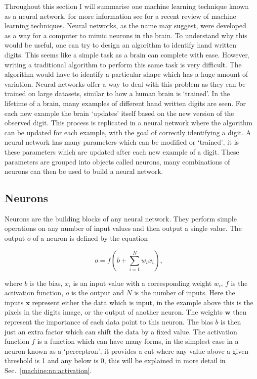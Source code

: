 Throughout this section I will summarise one machine learning technique known as a neural network, for more information see \citep{emmert-streib2020IntroductoryReview} for a recent review of machine learning techniques. 
Neural networks, as the name may suggest, were developed as a way for a computer to mimic neurons in the brain.
To understand why this would be useful, one can try to design an algorithm to identify hand written digits.
This seems like a simple task as a brain can complete with ease. 
However, writing a traditional algorithm to perform this same task is very difficult. 
The algorithm would have to identify a particular shape which has a huge amount of variation.
Neural networks offer a way to deal with this problem as they can be trained on large datasets, similar to how a human brain is `trained'. 
In the lifetime of a brain, many examples of different hand written digits are seen. 
For each new example the brain `updates' itself based on the new version of the observed digit. 
This process is replicated in a neural network where the algorithm can be updated for each example, with the goal of correctly identifying a digit.
A neural network has many parameters which can be modified or `trained', it is these parameters which are updated after each new example of a digit. 
These parameters are grouped into objects called neurons, many combinations of neurons can then be used to build a neural network.

\subsection{\label{machine:nn:neuron}Neurons}

Neurons are the building blocks of any neural network.
They perform simple operations on any number of input values and then output a single value.
The output $o$ of a neuron is defined by the equation

\begin{equation}
    o = f\left(b + \sum_{i=1}^{N} w_i x_i  \right),
    \label{machine:nn:neuron:equation}
\end{equation}

where $b$ is the bias, $x_i$ is an input value with a corresponding weight $w_i$, $f$ is the activation function, $o$ is the output and $N$ is the number of inputs.
Here the inputs $\bm{x}$ represent either the data which is input, in the example above this is the pixels in the digits image, or the output of another neuron.
The weights $\bm{w}$ then represent the importance of each data point to this neuron. 
The bias $b$ is then just an extra factor which can shift the data by a fixed value.
The activation function $f$ is a function which can have many forms, in the simplest case in a neuron known as a `perceptron', it provides a cut where any value above a given threshold is 1 and any below is 0, this will be explained in more detail in Sec.~\ref{machine:nn:activation}. 

